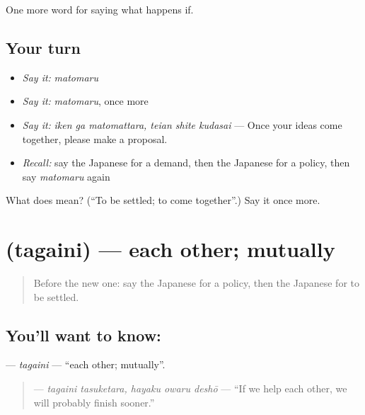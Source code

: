 \begin{grammarlens}[title={What you've built}]
One more word for saying what happens if.
\end{grammarlens}

\subsection*{Your turn}
\begin{itemize}
\raggedright
  \item \emph{Say it:} \emph{matomaru}
  \item \emph{Say it:} \emph{matomaru}, once more
  \item \emph{Say it:} \emph{iken ga matomattara, teian shite kudasai} — Once your ideas come together, please make a proposal.
  \item \emph{Recall:} say the Japanese for a demand, then the Japanese for a policy, then say \emph{matomaru} again
\end{itemize}

\begin{tcolorbox}[breakable,colback=teal!4,colframe=teal!35!black,title={Before you move on}]
What does  mean? (\textquotedblleft{}To be settled; to come together\textquotedblright{}.) Say it once more.
\end{tcolorbox}
\section[\texorpdfstring{\ja{たがいに} (tagaini)}{たがいに (tagaini)}]{ (tagaini) — each other; mutually}

\label{lesson:JA-C370-tagaini}



\begin{quote}
Before the new one: say the Japanese for a policy, then the Japanese for to be settled.
\end{quote}

\subsection*{You'll want to know: }
\textbf{} — \emph{tagaini} — \textquotedblleft{}each other; mutually\textquotedblright{}.

\begin{quote}
\textbf{  } — \emph{tagaini tasuketara, hayaku owaru deshō} — \textquotedblleft{}If we help each other, we will probably finish sooner.\textquotedblright{}
\end{quote}

